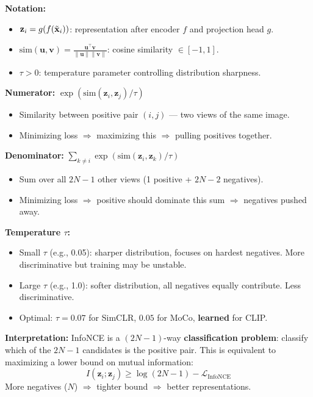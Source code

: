 \begin{keybox}
\textbf{Notation:}
\begin{itemize}
\item $\mathbf{z}_i = g(f(\tilde{\mathbf{x}}_i))$: representation after encoder $f$ and projection head $g$.
\item $\text{sim}(\mathbf{u},\mathbf{v}) = \frac{\mathbf{u}^\top\mathbf{v}}{\|\mathbf{u}\|\|\mathbf{v}\|}$: cosine similarity $\in [-1, 1]$.
\item $\tau > 0$: temperature parameter controlling distribution sharpness.
\end{itemize}

\textbf{Numerator:} $\exp(\text{sim}(\mathbf{z}_i, \mathbf{z}_j)/\tau)$
\begin{itemize}
\item Similarity between positive pair $(i,j)$ — two views of the same image.
\item Minimizing loss $\Rightarrow$ maximizing this $\Rightarrow$ pulling positives together.
\end{itemize}

\textbf{Denominator:} $\sum_{k \neq i} \exp(\text{sim}(\mathbf{z}_i, \mathbf{z}_k)/\tau)$
\begin{itemize}
\item Sum over all $2N-1$ other views (1 positive + $2N-2$ negatives).
\item Minimizing loss $\Rightarrow$ positive should dominate this sum $\Rightarrow$ negatives pushed away.
\end{itemize}

\textbf{Temperature $\tau$:}
\begin{itemize}
\item Small $\tau$ (e.g., 0.05): sharper distribution, focuses on hardest negatives. More discriminative but training may be unstable.
\item Large $\tau$ (e.g., 1.0): softer distribution, all negatives equally contribute. Less discriminative.
\item Optimal: $\tau = 0.07$ for SimCLR, $0.05$ for MoCo, \textbf{learned} for CLIP.
\end{itemize}

\textbf{Interpretation:} InfoNCE is a $(2N-1)$-way \textbf{classification problem}: classify which of the $2N-1$ candidates is the positive pair. This is equivalent to maximizing a lower bound on mutual information:
$$I(\mathbf{z}_i; \mathbf{z}_j) \geq \log(2N-1) - \mathcal{L}_{\text{InfoNCE}}$$
More negatives ($N$) $\Rightarrow$ tighter bound $\Rightarrow$ better representations.
\end{keybox}

